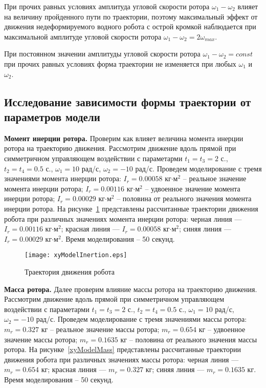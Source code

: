 При прочих равных условиях амплитуда угловой скорости ротора $\omega_1 - \omega_2$ влияет на величину пройденного пути по траектории, поэтому максимальный эффект от движения недеформируемого водного робота с острой кромкой наблюдается при максимальной амплитуде угловой скорости ротора $\omega_1 - \omega_2 = 2\omega_{max}$.

При постоянном значении амплитуды угловой скорости ротора $\omega_1 - \omega_2 = const$ при прочих равных условиях форма траектории не изменяется при любых $\omega_1$ и $\omega_2$.


\subsection{Исследование зависимости формы траектории от параметров модели}

\textbf{Момент инерции ротора.} Проверим как влияет величина момента инерции ротора на траекторию движения. Рассмотрим движение вдоль прямой при симметричном управляющем воздействии с параметарми $t_1=t_3=2$ с., $t_2=t_4 = 0.5$ с., $\omega_1=10$ рад/с, $\omega_2=-10$ рад/с. Проведем моделирование с тремя значениями момента инерции ротора: $I_r = 0.00058$ кг$\cdot$м$^2$ -- реальное значение момента инерции ротора; $I_r = 0.00116$ кг$\cdot$м$^2$ -- удвоенное значение момента инерции ротора; $I_r = 0.00029$ кг$\cdot$м$^2$ -- половина от реального значения момента инерции ротора. На рисунке~\ref{xyModelInertion} представлены рассчитанные траектории движения робота при различных значениях момента инерции ротора: черная линия --- $I_r = 0.00116$ кг$\cdot$м$^2$; красная линия --- $I_r = 0.00058$ кг$\cdot$м$^2$; синяя линия --- $I_r = 0.00029$ кг$\cdot$м$^2$. Время моделирования -- 50 секунд.

\begin{figure}[!ht]
	\centering
	\texttt{[image: xyModelInertion.eps]}
	\caption{Траектория движения робота}
	\label{xyModelInertion}
\end{figure}

\textbf{Масса ротора.} Далее проверим влияние массы ротора на траекторию движения. Рассмотрим движение вдоль прямой при симметричном управляющем воздействии с параметарми $t_1=t_3=2$ с., $t_2=t_4 = 0.5$ с., $\omega_1=10$ рад/с, $\omega_2=-10$ рад/с. Проведем моделирование с тремя значениями массы ротора: $m_r = 0.327$ кг -- реальное значение массы ротора; $m_r = 0.654$ кг -- удвоенное значение массы ротора; $m_r = 0.1635$ кг -- половина от реального значения массы ротора. На рисунке~\ref{xyModelMass} представлены рассчитанные траектории движения робота при различных значениях массы ротора: черная линия --- $m_r = 0.654$ кг; красная линия --- $m_r = 0.327$ кг; синяя линия --- $m_r = 0.1635$ кг. Время моделирования -- 50 секунд.

